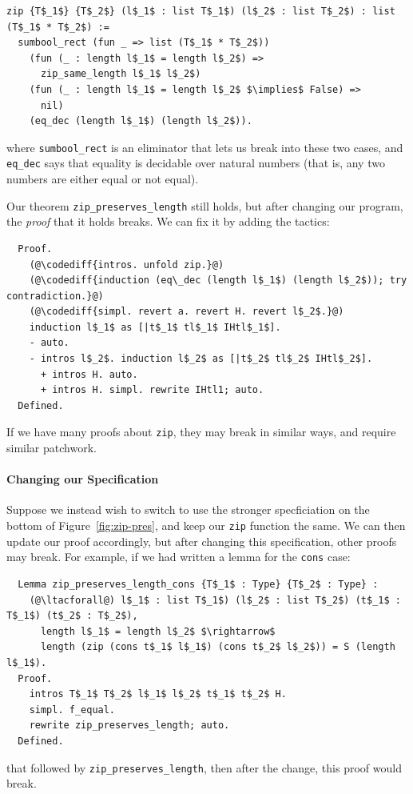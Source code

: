 \begin{lstlisting}
zip {T$_1$} {T$_2$} (l$_1$ : list T$_1$) (l$_2$ : list T$_2$) : list (T$_1$ * T$_2$) :=
  sumbool_rect (fun _ => list (T$_1$ * T$_2$))
    (fun (_ : length l$_1$ = length l$_2$) =>
      zip_same_length l$_1$ l$_2$)
    (fun (_ : length l$_1$ = length l$_2$ $\implies$ False) =>
      nil)
    (eq_dec (length l$_1$) (length l$_2$)).
\end{lstlisting}
where \lstinline{sumbool_rect} is an eliminator that lets us break into these two cases, and 
\lstinline{eq_dec} says that equality is decidable over natural numbers (that is, any two numbers are either equal or not equal).


Our theorem \lstinline{zip_preserves_length} still holds, but after changing our program, the \textit{proof} that it holds breaks.
We can fix it by adding the  tactics:

\begin{lstlisting}
  Proof.
    (@\codediff{intros. unfold zip.}@)
    (@\codediff{induction (eq\_dec (length l$_1$) (length l$_2$)); try contradiction.}@)
    (@\codediff{simpl. revert a. revert H. revert l$_2$.}@)
    induction l$_1$ as [|t$_1$ tl$_1$ IHtl$_1$].
    - auto.
    - intros l$_2$. induction l$_2$ as [|t$_2$ tl$_2$ IHtl$_2$].
      + intros H. auto.
      + intros H. simpl. rewrite IHtl1; auto.
  Defined.
\end{lstlisting}
If we have many proofs about \lstinline{zip}, they may break in similar ways, and require similar patchwork.

\paragraph{Changing our Specification}
Suppose we instead wish to switch to use the stronger specficiation on the bottom of Figure~\ref{fig:zip-pres},
and keep our \lstinline{zip} function the same.
We can then update our proof accordingly, but after changing this specification, other proofs may break.
For example, if we had written a lemma for the \lstinline{cons} case:

\begin{lstlisting}
  Lemma zip_preserves_length_cons {T$_1$ : Type} {T$_2$ : Type} :
    (@\ltacforall@) l$_1$ : list T$_1$) (l$_2$ : list T$_2$) (t$_1$ : T$_1$) (t$_2$ : T$_2$),
      length l$_1$ = length l$_2$ $\rightarrow$
      length (zip (cons t$_1$ l$_1$) (cons t$_2$ l$_2$)) = S (length l$_1$).
  Proof.
    intros T$_1$ T$_2$ l$_1$ l$_2$ t$_1$ t$_2$ H.
    simpl. f_equal.
    rewrite zip_preserves_length; auto.
  Defined.
\end{lstlisting}
that followed by \lstinline{zip_preserves_length},
then after the change, this proof would break.

